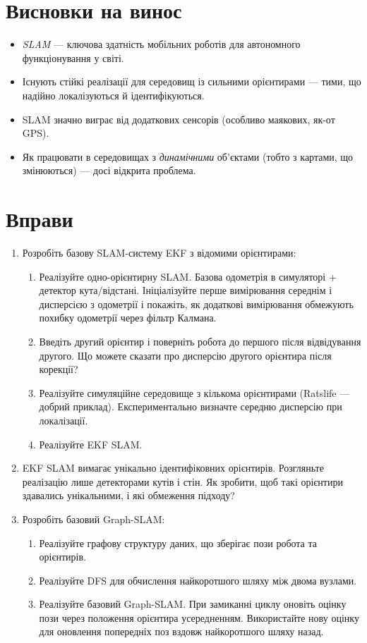 \section*{Висновки на винос}
\begin{itemize}
\item \emph{SLAM} — ключова здатність мобільних роботів для автономного функціонування у світі.
\item Існують стійкі реалізації для середовищ із сильними орієнтирами — тими, що надійно локалізуються й ідентифікуються.
\item SLAM значно виграє від додаткових сенсорів (особливо маякових, як-от GPS).
\item Як працювати в середовищах з \emph{динамічними} об'єктами (тобто з картами, що змінюються) — досі відкрита проблема.
\end{itemize}

\section*{Вправи}\small
\begin{enumerate}
\item Розробіть базову SLAM-систему EKF з відомими орієнтирами:
\begin{enumerate}
\item Реалізуйте одно-орієнтирну SLAM. Базова одометрія в симуляторі + детектор кута/відстані. Ініціалізуйте перше вимірювання середнім і дисперсією з одометрії і покажіть, як додаткові вимірювання обмежують похибку одометрії через фільтр Калмана.
\item Введіть другий орієнтир і поверніть робота до першого після відвідування другого. Що можете сказати про дисперсію другого орієнтира після корекції?
\item Реалізуйте симуляційне середовище з кількома орієнтирами (Ratslife — добрий приклад). Експериментально визначте середню дисперсію при локалізації.
\item Реалізуйте EKF SLAM.
\end{enumerate}
\item EKF SLAM вимагає унікально ідентифіковних орієнтирів. Розгляньте реалізацію лише детекторами кутів і стін. Як зробити, щоб такі орієнтири здавались унікальними, і які обмеження підходу?
\item Розробіть базовий Graph-SLAM:
\begin{enumerate}
\item Реалізуйте графову структуру даних, що зберігає пози робота та орієнтирів.
\item Реалізуйте DFS для обчислення найкоротшого шляху між двома вузлами.
\item Реалізуйте базовий Graph-SLAM. При замиканні циклу оновіть оцінку пози через положення орієнтира усередненням. Використайте нову оцінку для оновлення попередніх поз вздовж найкоротшого шляху назад.
\end{enumerate}
\end{enumerate}\normalsize
